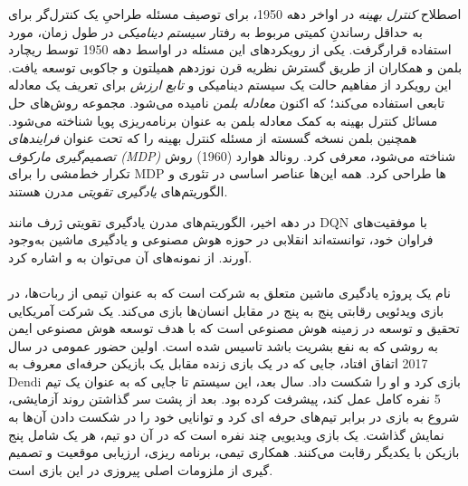 اصطلاح
\textit{کنترل بهینه}
در اواخر دهه 1950، برای توصیف مسئله طراحیِ یک کنترل‌گر برای به حداقل رساندنِ کمیتی مربوط به رفتار \textit{سیستم دینامیکی} در طول زمان، مورد استفاده قرارگرفت. یکی از رویکردهای این مسئله در اواسط دهه 1950 توسط ریچارد بلمن و همکاران از طریق گسترش نظریه قرن نوزدهم همیلتون و جاکوبی توسعه یافت. این رویکرد از مفاهیم حالت یک سیستم دینامیکی و \textit{تابع ارزش} برای تعریف یک معادله تابعی استفاده می‌کند؛ که اکنون \textit{معادله بلمن} نامیده می‌شود. مجموعه روش‌های حل مسائل کنترل بهینه به کمک معادله بلمن به عنوان برنامه‌ریزی پویا شناخته می‌شود. همچنین بلمن نسخه گسسته از مسئله کنترل بهینه را که تحت عنوان \textit{فرایندهای تصمیم‌گیری مارکوف (MDP)} 
شناخته می‌شود، معرفی کرد. رونالد هوارد (1960) روش تکرار خط‌مشی
را برای MDP‌‌ ها طراحی کرد. همه این‌ها عناصر اساسی در تئوری و الگوریتم‌های \textit{یادگیری تقویتی} مدرن هستند.

در دهه اخیر، الگوریتم‌های مدرن یادگیری تقویتی  ژرف مانند DQN با موفقیت‌های فراوان خود، توانسته‌اند انقلابی در حوزه هوش مصنوعی و یادگیری ماشین به‌وجود آورند. از نمونه‌های آن می‌توان به
 و
   اشاره کرد.
  
  \paragraph{}
    
   نام یک پروژه یادگیری ماشین متعلق به شرکت 
   است که به عنوان تیمی از ربات‌ها،  در بازی ویدئویی رقابتی پنج به پنج 
     در مقابل انسان‌ها بازی می‌کند.
 یک شرکت آمریکایی تحقیق و توسعه در زمینه هوش مصنوعی است که با هدف توسعه هوش مصنوعی ایمن به روشی که به نفع بشریت باشد تاسیس شده است. اولین حضور عمومی
  در سال 2017 اتفاق افتاد، جایی که در یک بازی زنده مقابل یک بازیکن حرفه‌ای معروف به Dendi بازی کرد و او را شکست داد. سال بعد، این سیستم تا جایی که به عنوان یک تیم 5 نفره کامل عمل کند، پیشرفت کرده بود. بعد از پشت سر گذاشتن روند آزمایشی، شروع به بازی در برابر تیم‌های حرفه ای کرد و توانایی خود را در شکست دادن آن‌ها به نمایش گذاشت. 
  یک بازی ویدیویی چند نفره است که در آن دو تیم، هر یک شامل پنج بازیکن با یکدیگر رقابت می‌کنند. همکاری تیمی، برنامه ریزی، ارزیابی موقعیت و تصمیم گیری از ملزومات اصلی پیروزی در این بازی است.
   
